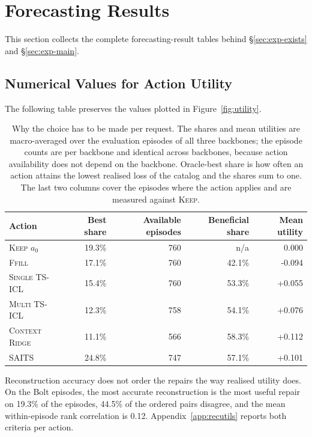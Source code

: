 \documentclass{article}
\begin{document}
\section{Forecasting Results}
\label{app:full-results}

This section collects the complete forecasting-result tables behind \S\ref{sec:exp-exists}
and \S\ref{sec:exp-main}.

\subsection{Numerical Values for Action Utility}
\label{app:main-values}
The following table preserves the values plotted in Figure~\ref{fig:utility}.

\begin{table}[t]
  \caption{Why the choice has to be made per request. The shares and mean utilities are
  macro-averaged over the evaluation episodes of all three backbones; the episode counts are
  per backbone and identical across backbones, because action availability does not depend on
  the backbone. Oracle-best share is how often an action attains the lowest realised loss of the
  catalog and the shares sum to one. The last two columns cover the episodes where the action
  applies and are measured against \textsc{Keep}.}
  \label{tab:heterogeneity}
  \centering
  \small
  \setlength{\tabcolsep}{4pt}
\begin{tabular*}{\textwidth}{@{\extracolsep{\fill}}lrrrr@{}}
    \toprule
    Action & Best share & Available episodes & Beneficial share & Mean utility \\
    \midrule
    \textsc{Keep} $a_0$ & 19.3\% & 760 & n/a & 0.000 \\
    \textsc{Ffill} & 17.1\% & 760 & 42.1\% & -0.094 \\
    \textsc{Single TS-ICL} & 15.4\% & 760 & 53.3\% & +0.055 \\
    \textsc{Multi TS-ICL} & 12.3\% & 758 & 54.1\% & +0.076 \\
    \textsc{Context Ridge} & 11.1\% & 566 & 58.3\% & +0.112 \\
    \textsc{SAITS} & 24.8\% & 747 & 57.1\% & +0.101 \\
    \bottomrule
  \end{tabular*}
  \vspace{-2pt}
  {\footnotesize Reconstruction accuracy does not order the repairs the way realised utility
  does. On the Bolt episodes, the most accurate reconstruction is the most useful repair on
  19.3\% of the
  episodes, 44.5\% of the ordered pairs disagree, and the mean within-episode
  rank correlation is 0.12. Appendix~\ref{app:recutils} reports both criteria per
  action.}
\end{table}
\end{document}
